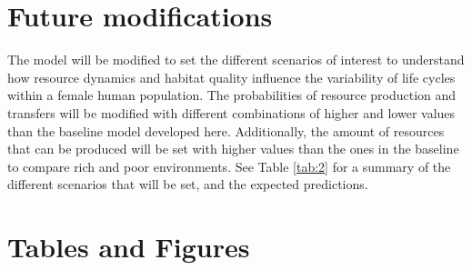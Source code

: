 \documentclass{article}
\begin{document}
\section{Future modifications}

The model will be modified to set the different scenarios of interest to understand how resource dynamics and habitat quality influence the variability of life cycles within a female human population. The probabilities of resource production and transfers will be modified with different combinations of higher and lower values than the baseline model developed here. Additionally, the amount of resources that can be produced will be set with higher values than the ones in the baseline to compare rich and poor environments. See Table \ref{tab:2} for a summary of the different scenarios that will be set, and the expected predictions.

\section{Tables and Figures}
\end{document}
